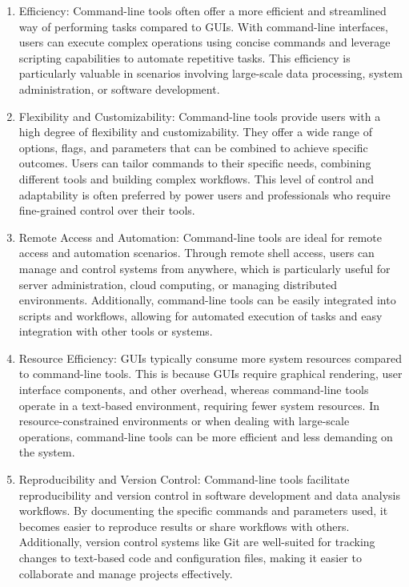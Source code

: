 \documentclass[../Master.tex]{subfiles}
\begin{document}
\begin{enumerate}
	\item Efficiency: Command-line tools often offer a more efficient and streamlined way of performing tasks compared to GUIs. With command-line interfaces, users can execute complex operations using concise commands and leverage scripting capabilities to automate repetitive tasks. This efficiency is particularly valuable in scenarios involving large-scale data processing, system administration, or software development.
	\item Flexibility and Customizability: Command-line tools provide users with a high degree of flexibility and customizability. They offer a wide range of options, flags, and parameters that can be combined to achieve specific outcomes. Users can tailor commands to their specific needs, combining different tools and building complex workflows. This level of control and adaptability is often preferred by power users and professionals who require fine-grained control over their tools.
	\item Remote Access and Automation: Command-line tools are ideal for remote access and automation scenarios. Through remote shell access, users can manage and control systems from anywhere, which is particularly useful for server administration, cloud computing, or managing distributed environments. Additionally, command-line tools can be easily integrated into scripts and workflows, allowing for automated execution of tasks and easy integration with other tools or systems.
	\item Resource Efficiency: GUIs typically consume more system resources compared to command-line tools. This is because GUIs require graphical rendering, user interface components, and other overhead, whereas command-line tools operate in a text-based environment, requiring fewer system resources. In resource-constrained environments or when dealing with large-scale operations, command-line tools can be more efficient and less demanding on the system.
	\item  Reproducibility and Version Control: Command-line tools facilitate reproducibility and version control in software development and data analysis workflows. By documenting the specific commands and parameters used, it becomes easier to reproduce results or share workflows with others. Additionally, version control systems like Git are well-suited for tracking changes to text-based code and configuration files, making it easier to collaborate and manage projects effectively.
\end{enumerate}
\end{document}
